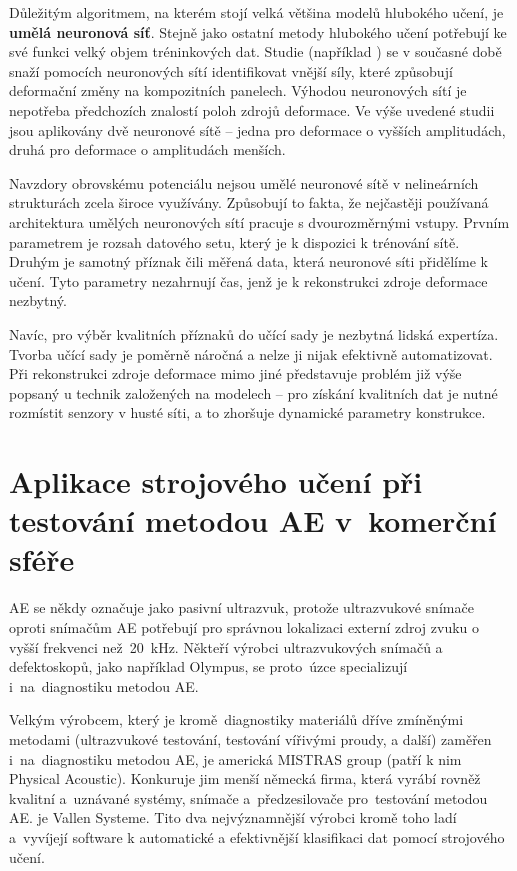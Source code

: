 Důležitým algoritmem, na kterém stojí velká většina modelů hlubokého učení, je \textbf{umělá neuronová síť}. Stejně jako ostatní metody hlubokého učení potřebují ke své funkci velký objem tréninkových dat. Studie (například \cite{ghajari}) se v současné době snaží pomocích neuronových sítí identifikovat vnější síly, které způsobují deformační změny na kompozitních panelech. Výhodou neuronových sítí je nepotřeba předchozích znalostí poloh zdrojů deformace. Ve výše uvedené studii jsou aplikovány dvě neuronové sítě – jedna pro deformace o vyšších amplitudách, druhá pro deformace o amplitudách menších.

Navzdory obrovskému potenciálu nejsou umělé neuronové sítě v nelineárních strukturách zcela široce využívány. Způsobují to fakta, že nejčastěji používaná architektura umělých neuronových sítí pracuje s dvourozměrnými vstupy. Prvním parametrem je rozsah datového setu, který je k dispozici k trénování sítě. Druhým je samotný příznak čili měřená data, která neuronové síti přidělíme k učení. Tyto parametry nezahrnují čas, jenž je k rekonstrukci zdroje deformace nezbytný.

Navíc, pro výběr kvalitních příznaků do učící sady je nezbytná lidská expertíza. Tvorba učící sady je poměrně náročná a nelze ji nijak efektivně automatizovat. Při rekonstrukci zdroje deformace mimo jiné představuje problém již výše popsaný u technik založených na modelech – pro získání kvalitních dat je nutné rozmístit senzory v husté síti, a to zhoršuje dynamické parametry konstrukce.

\section{Aplikace strojového učení při testování metodou 
AE v~komerční sféře}
\label{Sec:Kap1.5}
AE se někdy označuje jako pasivní ultrazvuk, 
protože ultrazvukové snímače oproti snímačům AE 
potřebují pro správnou lokalizaci externí zdroj zvuku o vyšší frekvenci než~20~kHz. 
Někteří výrobci ultrazvukových snímačů a defektoskopů, 
jako například Olympus, 
se proto~úzce specializují i~na~diagnostiku metodou AE. 

Velkým výrobcem, 
který je kromě~diagnostiky materiálů dříve zmíněnými metodami 
(ultrazvukové
testování, testování vířivými proudy, a další) zaměřen i~na~diagnostiku 
metodou AE, 
je americká MISTRAS group (patří k nim Physical Acoustic). 
Konkuruje jim menší německá firma, která vyrábí rovněž kvalitní a~uznávané
  systémy, snímače a~předzesilovače pro~testování metodou AE. 
  je Vallen Systeme. Tito dva nejvýznamnější výrobci kromě toho ladí 
  a~vyvíjejí software k automatické a efektivnější 
  klasifikaci dat pomocí strojového učení.

